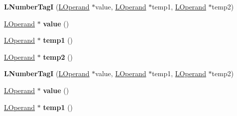 \begin{DoxyCompactItemize}
\item 
{\bfseries L\+Number\+TagI} (\hyperlink{classv8_1_1internal_1_1_l_operand}{L\+Operand} $\ast$value, \hyperlink{classv8_1_1internal_1_1_l_operand}{L\+Operand} $\ast$temp1, \hyperlink{classv8_1_1internal_1_1_l_operand}{L\+Operand} $\ast$temp2)\hypertarget{classv8_1_1internal_1_1_l_number_tag_i_a4454430c378e86af6c4da1c174621290}{}\label{classv8_1_1internal_1_1_l_number_tag_i_a4454430c378e86af6c4da1c174621290}

\item 
\hyperlink{classv8_1_1internal_1_1_l_operand}{L\+Operand} $\ast$ {\bfseries value} ()\hypertarget{classv8_1_1internal_1_1_l_number_tag_i_af1937f50e27c8665954070a538f640e4}{}\label{classv8_1_1internal_1_1_l_number_tag_i_af1937f50e27c8665954070a538f640e4}

\item 
\hyperlink{classv8_1_1internal_1_1_l_operand}{L\+Operand} $\ast$ {\bfseries temp1} ()\hypertarget{classv8_1_1internal_1_1_l_number_tag_i_a2fecebdcf5d9ce508e3fd3f24ee82850}{}\label{classv8_1_1internal_1_1_l_number_tag_i_a2fecebdcf5d9ce508e3fd3f24ee82850}

\item 
\hyperlink{classv8_1_1internal_1_1_l_operand}{L\+Operand} $\ast$ {\bfseries temp2} ()\hypertarget{classv8_1_1internal_1_1_l_number_tag_i_aaa03e3b699a9c03b971db41b85de0351}{}\label{classv8_1_1internal_1_1_l_number_tag_i_aaa03e3b699a9c03b971db41b85de0351}

\item 
{\bfseries L\+Number\+TagI} (\hyperlink{classv8_1_1internal_1_1_l_operand}{L\+Operand} $\ast$value, \hyperlink{classv8_1_1internal_1_1_l_operand}{L\+Operand} $\ast$temp1, \hyperlink{classv8_1_1internal_1_1_l_operand}{L\+Operand} $\ast$temp2)\hypertarget{classv8_1_1internal_1_1_l_number_tag_i_a4454430c378e86af6c4da1c174621290}{}\label{classv8_1_1internal_1_1_l_number_tag_i_a4454430c378e86af6c4da1c174621290}

\item 
\hyperlink{classv8_1_1internal_1_1_l_operand}{L\+Operand} $\ast$ {\bfseries value} ()\hypertarget{classv8_1_1internal_1_1_l_number_tag_i_af1937f50e27c8665954070a538f640e4}{}\label{classv8_1_1internal_1_1_l_number_tag_i_af1937f50e27c8665954070a538f640e4}

\item 
\hyperlink{classv8_1_1internal_1_1_l_operand}{L\+Operand} $\ast$ {\bfseries temp1} ()\hypertarget{classv8_1_1internal_1_1_l_number_tag_i_a2fecebdcf5d9ce508e3fd3f24ee82850}{}\label{classv8_1_1internal_1_1_l_number_tag_i_a2fecebdcf5d9ce508e3fd3f24ee82850}


\end{DoxyCompactItemize}
